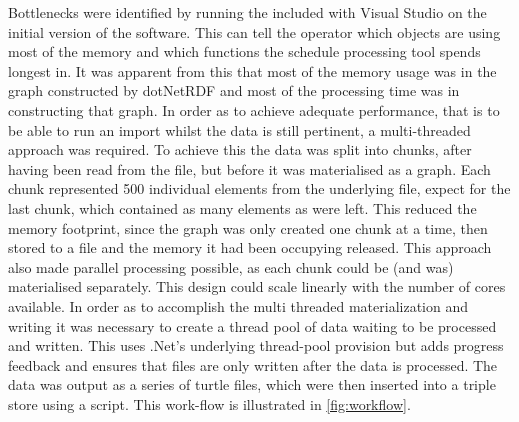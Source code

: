 Bottlenecks were identified by running the  included with Visual Studio on the initial version of the software. This can tell the operator which objects are using most of the memory and which functions the schedule processing tool spends longest in. It was apparent from this that most of the memory usage was in the graph constructed by dotNetRDF and most of the processing time was in constructing that graph. In order as to achieve adequate performance, that is to be able to run an import whilst the data is still pertinent, a multi-threaded approach was required. To achieve this the data was split into chunks, after having been read from the file, but before it was materialised as a graph. Each chunk represented 500 individual elements from the underlying file, expect for the last chunk, which contained as many elements as were left. This reduced the memory footprint, since the graph was only created one chunk at a time, then stored to a file and the memory it had been occupying released. This approach also made parallel processing possible, as each chunk could be (and was) materialised separately. This design could scale linearly with the number of cores available. In order as to accomplish the multi threaded materialization and writing it was necessary to create a thread pool of data waiting to be processed and written. This uses .Net's underlying thread-pool provision but adds progress feedback and ensures that files are only written after the data is processed. The data was output as a series of turtle files, which were then inserted into a triple store using a script. This work-flow is illustrated in \autoref{fig:workflow}.

